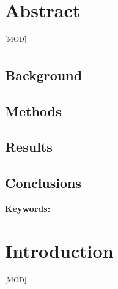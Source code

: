 \documentclass[12pt]{article}
\newcommand{\GradeModerate}{\textsuperscript{\textsf{[MOD]}}}
\begin{document}
\newpage
\section*{Abstract}\GradeModerate

\subsection*{Background}


\subsection*{Methods}


\subsection*{Results}


\subsection*{Conclusions}


\vspace{0.5cm}
\noindent\textbf{Keywords:} 

\pagebreak

\linenumbers

\section{Introduction}\label{sec:introduction}\GradeModerate









\end{document}
